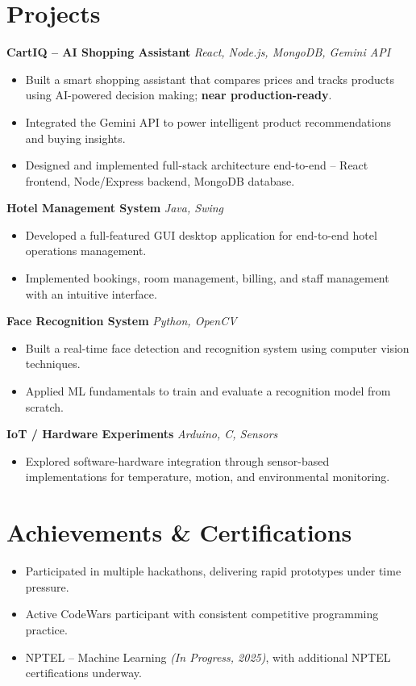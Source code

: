 \documentclass[a4paper,10pt]{article}
\newenvironment{tightList}{\begin{itemize}[noitemsep,topsep=2pt,leftmargin=14pt]}{\end{itemize}}
\begin{document}
\section*{Projects}

\textbf{CartIQ -- AI Shopping Assistant} \hfill \textit{React, Node.js, MongoDB, Gemini API}
\begin{tightList}
\item Built a smart shopping assistant that compares prices and tracks products using AI-powered decision making; \textbf{near production-ready}.
\item Integrated the Gemini API to power intelligent product recommendations and buying insights.
\item Designed and implemented full-stack architecture end-to-end -- React frontend, Node/Express backend, MongoDB database.
\end{tightList}

\textbf{Hotel Management System} \hfill \textit{Java, Swing}
\begin{tightList}
\item Developed a full-featured GUI desktop application for end-to-end hotel operations management.
\item Implemented bookings, room management, billing, and staff management with an intuitive interface.
\end{tightList}

\textbf{Face Recognition System} \hfill \textit{Python, OpenCV}
\begin{tightList}
\item Built a real-time face detection and recognition system using computer vision techniques.
\item Applied ML fundamentals to train and evaluate a recognition model from scratch.
\end{tightList}

\textbf{IoT / Hardware Experiments} \hfill \textit{Arduino, C, Sensors}
\begin{tightList}
\item Explored software-hardware integration through sensor-based implementations for temperature, motion, and environmental monitoring.
\end{tightList}

\section*{Achievements \& Certifications}
\begin{tightList}
\item Participated in multiple hackathons, delivering rapid prototypes under time pressure.
\item Active CodeWars participant with consistent competitive programming practice.
\item NPTEL -- Machine Learning \textit{(In Progress, 2025)}, with additional NPTEL certifications underway.
\end{tightList}
\end{document}
